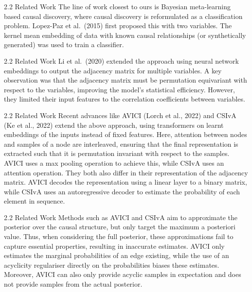\documentclass[aspectratio=169,10pt]{beamer}
\begin{document}
\begin{frame}{2.2 Related Work}
The line of work closest to ours is Bayesian meta-learning based causal discovery, where causal discovery is reformulated as a classification problem. Lopez-Paz et al.\ (2015) first proposed this with two variables. The kernel mean embedding of data with known causal relationships (or synthetically generated) was used to train a classifier.
\end{frame}

\begin{frame}{2.2 Related Work}
Li et al.\ (2020) extended the approach using neural network embeddings to output the adjacency matrix for multiple variables. A key observation was that the adjacency matrix must be permutation equivariant with respect to the variables, improving the model's statistical efficiency. However, they limited their input features to the correlation coefficients between variables.
\end{frame}

\begin{frame}{2.2 Related Work}
\small
Recent advances like AVICI (Lorch et al., 2022) and CSIvA (Ke et al., 2022) extend the above approach, using transformers on learnt embeddings of the inputs instead of fixed features. Here, attention between nodes and samples of a node are interleaved, ensuring that the final representation is extracted such that it is permutation invariant with respect to the samples. AVICI uses a max pooling operation to achieve this, while CSIvA uses an attention operation. They both also differ in their representation of the adjacency matrix. AVICI decodes the representation using a linear layer to a binary matrix, while CSIvA uses an autoregressive decoder to estimate the probability of each element in sequence.
\end{frame}

\begin{frame}{2.2 Related Work}
\small
Methods such as AVICI and CSIvA aim to approximate the posterior over the causal structure, but only target the maximum a posteriori value. Thus, when considering the full posterior, these approximations fail to capture essential properties, resulting in inaccurate estimates. AVICI only estimates the marginal probabilities of an edge existing, while the use of an acyclicity regulariser directly on the probabilities biases these estimates. Moreover, AVICI can also only provide acyclic samples in expectation and does not provide samples from the actual posterior.
\end{frame}
\end{document}
